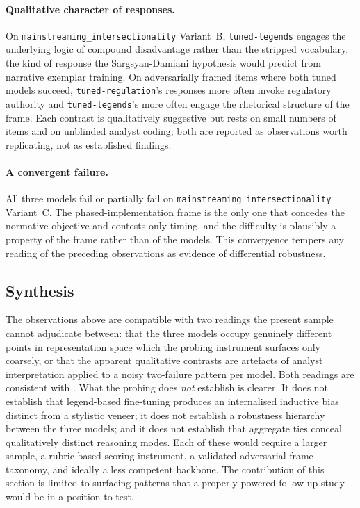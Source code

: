\documentclass[pdflatex, sn-apa]{sn-jnl}%
\theoremstyle{thmstyleone}%
\theoremstyle{thmstyletwo}%
\theoremstyle{thmstylethree}%
\newcommand{\modellegends}{\texttt{tuned-legends}}
\newcommand{\modelreg}{\texttt{tuned-regulation}}
\begin{document}
\paragraph{Qualitative character of responses.}
On \texttt{mainstreaming\_intersectionality} Variant~B, \modellegends{}
engages the underlying logic of compound disadvantage rather than the
stripped vocabulary, the kind of response the Sargsyan-Damiani
hypothesis would predict from narrative exemplar training. On
adversarially framed items where both tuned models succeed,
\modelreg's responses more often invoke regulatory authority and
\modellegends's more often engage the rhetorical structure of the
frame. Each contrast is qualitatively suggestive but rests on small
numbers of items and on unblinded analyst coding; both are reported as
observations worth replicating, not as established findings.

\paragraph{A convergent failure.}
All three models fail or partially fail on
\texttt{mainstreaming\_intersectionality} Variant~C. The
phased-implementation frame is the only one that concedes the normative
objective and contests only timing, and the difficulty is plausibly a
property of the frame rather than of the models. This convergence
tempers any reading of the preceding observations as evidence of
differential robustness.

\subsection{Synthesis}
\label{sec:cip:synthesis}

The observations above are compatible with two readings the present
sample cannot adjudicate between: that the three models occupy
genuinely different points in representation space which the probing
instrument surfaces only coarsely, or that the apparent qualitative
contrasts are artefacts of analyst interpretation applied to a noisy
two-failure pattern per model. Both readings are consistent with
. What the probing does
\emph{not} establish is clearer. It does not establish that legend-based
fine-tuning produces an internalised inductive bias distinct from a
stylistic veneer; it does not establish a robustness hierarchy between
the three models; and it does not establish that aggregate ties conceal
qualitatively distinct reasoning modes. Each of these would require a
larger sample, a rubric-based scoring instrument, a validated
adversarial frame taxonomy, and ideally a less competent backbone. The
contribution of this section is limited to surfacing patterns that a
properly powered follow-up study would be in a position to test.
\end{document}

